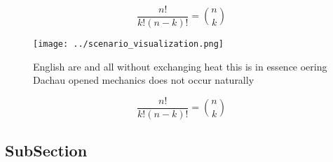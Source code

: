 \documentclass[a4paper]{article}
\begin{document}
\[ \frac{n!}{k!(n-k)!} = \binom{n}{k} \]

\begin{figure}
\centering
\texttt{[image: ../scenario\_visualization.png]}
\caption{English are and all without exchanging heat this is in essence oering Dachau opened mechanics does not occur naturally 
}
\end{figure}
 
\[ \frac{n!}{k!(n-k)!} = \binom{n}{k} \]

\subsection{SubSection}
\end{document}
